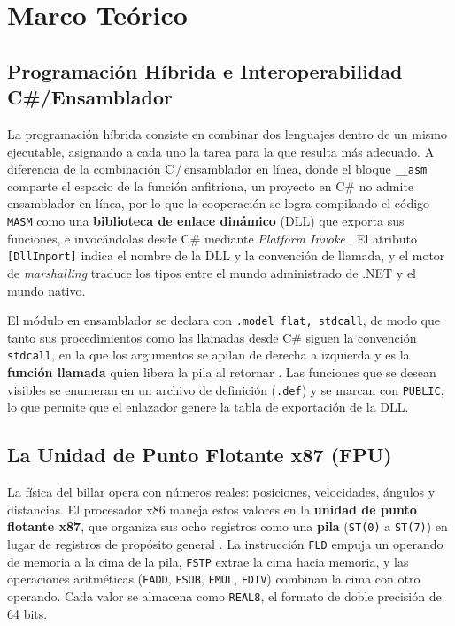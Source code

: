 \documentclass[a4paper,12pt]{article}
\begin{document}
\section{Marco Teórico}
\subsection{Programación Híbrida e Interoperabilidad C\#/Ensamblador}
La programación híbrida consiste en combinar dos lenguajes dentro de un mismo ejecutable, asignando a cada uno la tarea para la que resulta más adecuado. A diferencia de la combinación C\,/\,ensamblador en línea, donde el bloque \texttt{\_\_asm} comparte el espacio de la función anfitriona, un proyecto en C\# no admite ensamblador en línea, por lo que la cooperación se logra compilando el código \texttt{MASM} como una \textbf{biblioteca de enlace dinámico} (DLL) que exporta sus funciones, e invocándolas desde C\# mediante \textit{Platform Invoke} \cite{microsoft2023pinvoke}. El atributo \texttt{[DllImport]} indica el nombre de la DLL y la convención de llamada, y el motor de \textit{marshalling} traduce los tipos entre el mundo administrado de .NET y el mundo nativo.

El módulo en ensamblador se declara con \texttt{.model flat, stdcall}, de modo que tanto sus procedimientos como las llamadas desde C\# siguen la convención \texttt{stdcall}, en la que los argumentos se apilan de derecha a izquierda y es la \textbf{función llamada} quien libera la pila al retornar \cite{irvine2020assembly}. Las funciones que se desean visibles se enumeran en un archivo de definición (\texttt{.def}) y se marcan con \texttt{PUBLIC}, lo que permite que el enlazador genere la tabla de exportación de la DLL.

\subsection{La Unidad de Punto Flotante x87 (FPU)}
La física del billar opera con números reales: posiciones, velocidades, ángulos y distancias. El procesador x86 maneja estos valores en la \textbf{unidad de punto flotante x87}, que organiza sus ocho registros como una \textbf{pila} (\texttt{ST(0)} a \texttt{ST(7)}) en lugar de registros de propósito general \cite{intel2023sdm}. La instrucción \texttt{FLD} empuja un operando de memoria a la cima de la pila, \texttt{FSTP} extrae la cima hacia memoria, y las operaciones aritméticas (\texttt{FADD}, \texttt{FSUB}, \texttt{FMUL}, \texttt{FDIV}) combinan la cima con otro operando. Cada valor se almacena como \texttt{REAL8}, el formato de doble precisión de 64 bits.
\end{document}
